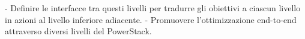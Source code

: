 - Definire le interfacce tra questi livelli per tradurre gli obiettivi a ciascun livello in azioni al livello inferiore adiacente.
- Promuovere l'ottimizzazione end-to-end attraverso diversi livelli del PowerStack.



